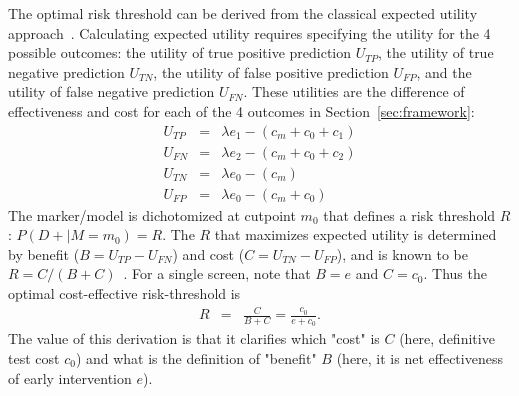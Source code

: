 \documentclass[AMA,STIX1COL]{WileyNJD-v2}
\begin{document}
The optimal risk threshold can be derived from the classical expected utility approach~\citep{Pauker1980}.  Calculating expected utility requires specifying the utility for the 4 possible outcomes: the utility of true positive prediction $U_{TP}$, the utility of true negative prediction $U_{TN}$, the utility of false positive prediction $U_{FP}$, and the utility of false negative prediction $U_{FN}$.  These utilities are the difference of effectiveness and cost for each of the 4 outcomes in Section~\ref{sec:framework}:
\begin{eqnarray*}
	U_{TP} &=& \lambda e_1 - (c_m+c_0+c_1) \\
	U_{FN} &=& \lambda e_2 - (c_m+c_0+c_2)\\	
	U_{TN} &=& \lambda e_0 - (c_m)\\
	U_{FP} &=& \lambda e_0 - (c_m+c_0)
\end{eqnarray*}
The marker/model is dichotomized at cutpoint $m_0$ that defines a risk threshold $R$: $P(D+|M=m_0)=R$.  The $R$ that maximizes expected utility is determined by benefit ($B=U_{TP}-U_{FN}$) and cost ($C=U_{TN}-U_{FP}$), and is known to be $R=C/(B+C)$~\citep{Pauker1980}.  For a single screen, note that $B=e$ and $C=c_0$.  Thus the optimal cost-effective risk-threshold is
\begin{eqnarray}
R &=& \frac{C}{B+C} = \frac{c_0}{e+c_0}.
\end{eqnarray} 
The value of this derivation is that it clarifies which "cost" is $C$ (here, definitive test cost $c_0$) and what is the definition of "benefit" $B$ (here, it is net effectiveness of early intervention $e$).


%
\end{document}
